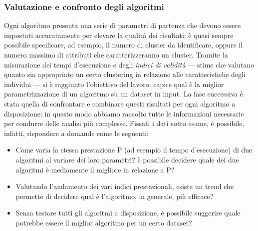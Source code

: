 \subsubsection{Valutazione e confronto degli algoritmi}
Ogni algoritmo presenta una serie di parametri di partenza che devono essere impostati accuratamente per elevare la qualit\`a dei risultati: \`e quasi sempre possibile specificare, ad esempio, il numero di cluster da identificare, oppure il numero massimo di attributi che caratterizzeranno un cluster. %
Tramite la misurazione dei tempi d'esecuzione e degli \textit{indici di validit\`a} --- stime che valutano quanto sia appropriato un certo clustering in relazione alle caratteristiche degli individui --- si \`e raggiunto l'obiettivo  del lavoro: capire qual \`e la miglior parametrizzazione di un algoritmo su un dataset in input. La fase successiva \`e stata quella di confrontare e combinare questi risultati per ogni algoritmo a disposizione: in questo modo abbiamo raccolto tutte le informazioni necessarie per condurre delle analisi pi\`u complesse.
Fissati i dati sotto esame, \`e possibile, infatti, rispondere a domande come le seguenti:
\begin{itemize}
\item Come varia la stessa prestazione P (ad esempio il tempo d'esecuzione) di due algoritmi al variare dei loro parametri? \`e possibile decidere quale dei due algoritmi \`e mediamente il migliore in relazione a P?
\item Valutando l'andamento dei vari indici prestazionali, esiste un trend che permette di decidere qual \`e l'algoritmo, in generale, pi\`u efficace?
\item Senza testare tutti gli algoritmi a disposizione, \`e possibile suggerire quale potrebbe essere il miglior algoritmo per un certo dataset?
\end{itemize}

